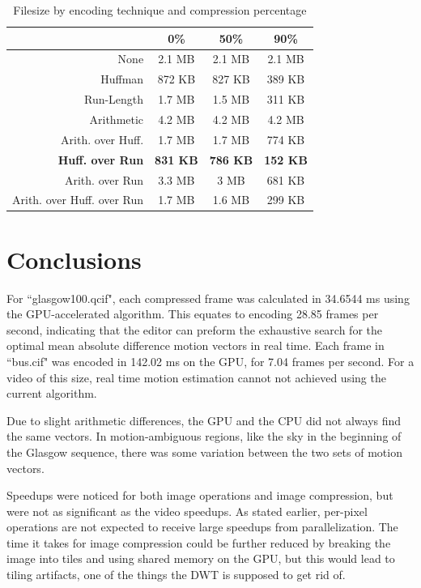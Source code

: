 \documentclass[10pt,twocolumn,twoside]{IEEEtran}
\begin{document}
\begin{table}[htdp]
\caption{Filesize by encoding technique and compression percentage}
\vskip -15pt
\label{table:filesize}
\small{
\begin{center}
\begin{tabular}{|r|c|c|c|}
\hline
 & 0\%  & 50\% & 90\% \\
 \hline
 None & 2.1 MB & 2.1 MB & 2.1 MB\\
 \hline
 Huffman & 872 KB & 827 KB & 389 KB\\
 \hline
 Run-Length & 1.7 MB & 1.5 MB & 311 KB\\
 \hline
 Arithmetic & 4.2 MB & 4.2 MB & 4.2 MB\\
 \hline
 Arith. over Huff. & 1.7 MB & 1.7 MB & 774 KB\\
 \hline
 \textbf{Huff. over Run} & \textbf{831 KB} & \textbf{786 KB} & \textbf{152 KB}\\
 \hline
 Arith. over Run & 3.3 MB & 3 MB & 681 KB\\
 \hline
 Arith. over Huff. over Run & 1.7 MB & 1.6 MB & 299 KB\\
 \hline
\end{tabular}
\end{center}
}
\end{table}


\section{Conclusions}
For ``glasgow100.qcif", each compressed frame was calculated in 34.6544 ms using the GPU-accelerated algorithm. This equates to encoding 28.85 frames per second, indicating that the editor can preform the exhaustive search for the optimal mean absolute difference motion vectors in real time. Each frame in ``bus.cif" was encoded in 142.02 ms on the GPU, for 7.04 frames per second. For a video of this size, real time motion estimation cannot not achieved using the current algorithm.

Due to slight arithmetic differences, the GPU and the CPU did not always find the same vectors. In motion-ambiguous regions, like the sky in the beginning of the Glasgow sequence, there was some variation between the two sets of motion vectors.

Speedups were noticed for both image operations and image compression, but were not as significant as the video speedups. As stated earlier, per-pixel operations are not expected to receive large speedups from parallelization. The time it takes for image compression could be further reduced by breaking the image into tiles and using shared memory on the GPU, but this would lead to tiling artifacts, one of the things the DWT is supposed to get rid of.
\end{document}
